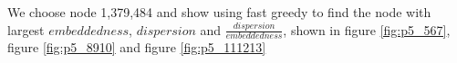\documentclass{article}
\begin{document}
\newpage
\noindent We choose node 1,379,484 and show using fast greedy to find the node with largest $embeddedness$, $dispersion$ and $\frac{dispersion}{embeddedness}$, shown in figure \ref{fig:p5_567}, figure \ref{fig:p5_8910} and figure \ref{fig:p5_111213} \\ 
\begin{figure}[htbp]
\centering
{}
\end{figure}
\end{document}
